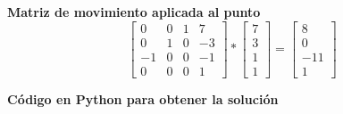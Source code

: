 \documentclass[a4paper, 12pt]{article}
\begin{document}
\textbf{Matriz de movimiento aplicada al punto}
\begin{equation*}
    \begin{bmatrix}
        0  & 0 & 1 & 7  \\
        0  & 1 & 0 & -3 \\
        -1 & 0 & 0 & -1 \\
        0  & 0 & 0 & 1
    \end{bmatrix}
    *
    \begin{bmatrix}
        7 \\
        3 \\
        1 \\
        1
    \end{bmatrix}
    =
    \begin{bmatrix}
        8   \\
        0   \\
        -11 \\
        1
    \end{bmatrix}
\end{equation*}

\textbf{Código en Python para obtener la solución}

\end{document}
